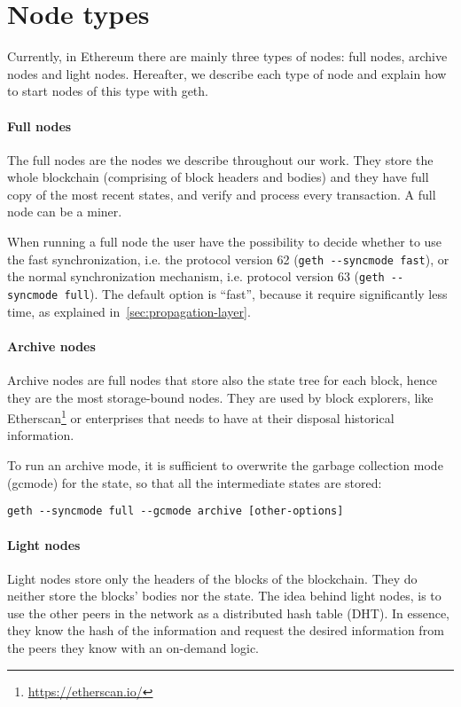 \section{Node types}
\label{sec:node-types}
Currently, in Ethereum there are mainly three types of nodes: full nodes,
archive nodes and light nodes. Hereafter, we describe each type of node and
explain how to start nodes of this type with geth.

\paragraph{Full nodes}
The full nodes are the nodes we describe throughout our work. They store the
whole blockchain (comprising of block headers and bodies) and they have full
copy of the most recent states, and verify and process every transaction. A full
node can be a miner.

When running a full node the user have the possibility to decide whether to use
the fast synchronization, i.e. the protocol version 62
(\verb|geth --syncmode fast|), or the normal synchronization mechanism, i.e.
protocol version 63 (\verb|geth --syncmode full|). The default option is
``fast'', because it require significantly less time, as explained
in~\autoref{sec:propagation-layer}.

\paragraph{Archive nodes}
Archive nodes are full nodes that store also the state tree for each block,
hence they are the most storage-bound nodes. They are used by block explorers,
like Etherscan\footnote{\url{https://etherscan.io/}} or enterprises that needs
to have at their disposal historical information.

To run an archive mode, it is sufficient to overwrite the garbage collection
mode (gcmode) for the state, so that all the intermediate states are stored:
\begin{center}
\verb|geth --syncmode full --gcmode archive [other-options]|
\end{center}

\paragraph{Light nodes}
Light nodes store only the headers of the blocks of the blockchain. They do
neither store the blocks' bodies nor the state. The idea behind light nodes, is
to use the other peers in the network as a distributed hash table (DHT).
In essence, they know the hash of the information and request the desired
information from the peers they know with an on-demand logic.

